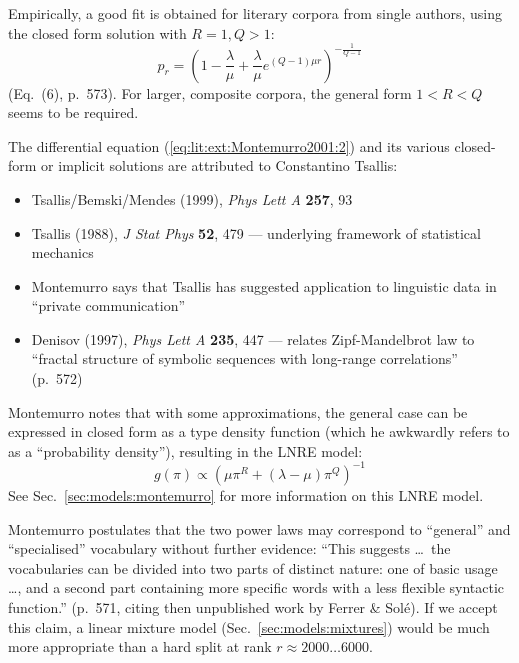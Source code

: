\documentclass[a4paper]{article}
\begin{document}
Empirically, a good fit is obtained for literary corpora from single authors, using the closed form solution with $R = 1, Q > 1$:
\begin{equation}
  \label{eq:lit:ext:Montemurro2001:3}
  p_r = \left( 1 - \frac{\lambda}{\mu} + \frac{\lambda}{\mu} e^{(Q-1) \mu r} \right)^{-\frac1{Q-1}}
\end{equation}
(Eq.~(6), p.~573).  For larger, composite corpora, the general form $1 < R < Q$ seems to be required.

The differential equation (\ref{eq:lit:ext:Montemurro2001:2}) and its various closed-form or implicit solutions are attributed to Constantino Tsallis:
\begin{itemize}
\item Tsallis/Bemski/Mendes (1999), \emph{Phys Lett A} \textbf{257}, 93
\item Tsallis (1988), \emph{J Stat Phys} \textbf{52}, 479 --- underlying framework of statistical mechanics
\item Montemurro says that Tsallis has suggested application to linguistic data in ``private communication''
\item Denisov (1997), \emph{Phys Lett A} \textbf{235}, 447 --- relates Zipf-Mandelbrot law to ``fractal structure of symbolic sequences with long-range correlations'' (p.~572)
\end{itemize}

Montemurro notes that with some approximations, the general case can be expressed in closed form as a type density function (which he awkwardly refers to as a ``probability density''), resulting in the LNRE model:
\begin{equation}
  \label{eq:lit:ext:Montemurro2001:4}
  g(\pi) \propto \left( \mu \pi^R + (\lambda-\mu) \pi^Q \right)^{-1}
\end{equation}
See Sec.~\ref{sec:models:montemurro} for more information on this LNRE model.

Montemurro postulates that the two power laws may correspond to ``general'' and ``specialised'' vocabulary without further evidence: ``This suggests \ldots\ the vocabularies can be divided into two parts of distinct nature: one of basic usage \dots, and a second part containing more specific words with a less flexible syntactic function.'' (p.~571, citing then unpublished work by Ferrer \& Solé).  If we accept this claim, a linear mixture model (Sec.~\ref{sec:models:mixtures}) would be much more appropriate than a hard split at rank $r\approx 2000 \ldots 6000$.
\end{document}
